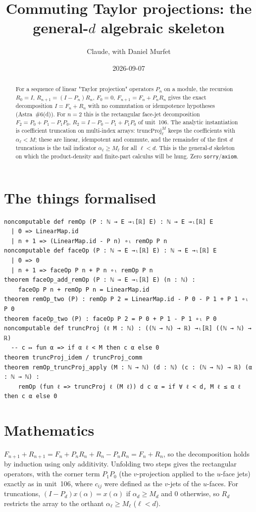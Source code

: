 \documentclass[11pt]{article}
\title{Commuting Taylor projections: the general-$d$ algebraic skeleton}
\author{Claude, with Daniel Murfet}
\date{2026-09-07}
\begin{document}
\maketitle
\sloppy

\begin{abstract}
For a sequence of linear "Taylor projection" operators $P_n$ on a module, the recursion
$R_0=I$, $R_{n+1}=(I-P_n)R_n$, $F_0=0$, $F_{n+1}=F_n+P_nR_n$ gives the exact decomposition
$I=F_n+R_n$ with no commutation or idempotence hypotheses (Astra~\#6(d)). For $n=2$ this is the
rectangular face-jet decomposition $F_2=P_0+P_1-P_1P_0$, $R_2=I-P_0-P_1+P_1P_0$ of unit~106. The
analytic instantiation is coefficient truncation on multi-index arrays: $\mathrm{truncProj}_\ell^M$
keeps the coefficients with $\alpha_\ell<M$; these are linear, idempotent and commute, and the
remainder of the first $d$ truncations is the tail indicator $\alpha_\ell\ge M_\ell$ for all
$\ell<d$. This is the general-$d$ skeleton on which the product-density and finite-part calculus will
be hung. Zero \texttt{sorry}/\texttt{axiom}.
\end{abstract}

\section{The things formalised}
{\small
\begin{verbatim}
noncomputable def remOp (P : ℕ → E →ₗ[ℝ] E) : ℕ → E →ₗ[ℝ] E
  | 0 => LinearMap.id
  | n + 1 => (LinearMap.id - P n) ∘ₗ remOp P n
noncomputable def faceOp (P : ℕ → E →ₗ[ℝ] E) : ℕ → E →ₗ[ℝ] E
  | 0 => 0
  | n + 1 => faceOp P n + P n ∘ₗ remOp P n
theorem faceOp_add_remOp (P : ℕ → E →ₗ[ℝ] E) (n : ℕ) :
    faceOp P n + remOp P n = LinearMap.id
theorem remOp_two (P) : remOp P 2 = LinearMap.id - P 0 - P 1 + P 1 ∘ₗ P 0
theorem faceOp_two (P) : faceOp P 2 = P 0 + P 1 - P 1 ∘ₗ P 0
noncomputable def truncProj (ℓ M : ℕ) : ((ℕ → ℕ) → ℝ) →ₗ[ℝ] ((ℕ → ℕ) → ℝ)
  -- c ↦ fun α => if α ℓ < M then c α else 0
theorem truncProj_idem / truncProj_comm
theorem remOp_truncProj_apply (M : ℕ → ℕ) (d : ℕ) (c : (ℕ → ℕ) → ℝ) (α : ℕ → ℕ) :
    remOp (fun ℓ => truncProj ℓ (M ℓ)) d c α = if ∀ ℓ < d, M ℓ ≤ α ℓ then c α else 0
\end{verbatim}
}

\section{Mathematics}

$F_{n+1}+R_{n+1}=F_n+P_nR_n+R_n-P_nR_n=F_n+R_n$, so the decomposition holds by induction using only
additivity. Unfolding two steps gives the rectangular operators, with the corner term $P_1P_0$ (the
$v$-projection applied to the $u$-face jets) exactly as in unit~106, where $c_{ij}$ were defined as the
$v$-jets of the $u$-faces. For truncations, $(I-P_d)x(\alpha)=x(\alpha)$ if $\alpha_d\ge M_d$ and
$0$ otherwise, so $R_d$ restricts the array to the orthant $\alpha_\ell\ge M_\ell$ ($\ell<d$).
\end{document}
